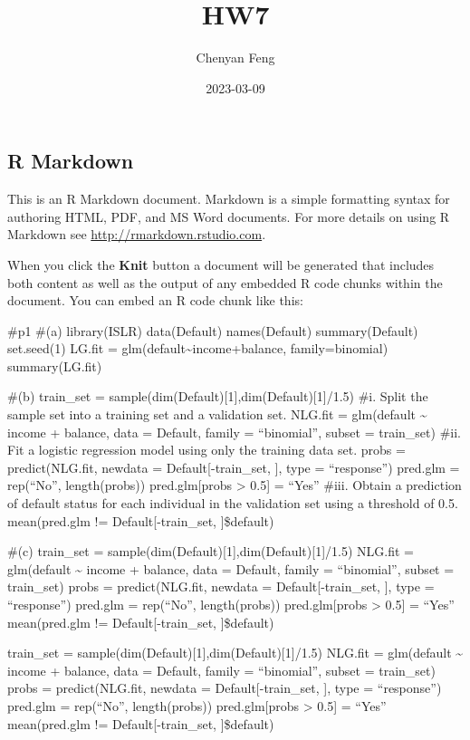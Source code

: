 \documentclass[
]{article}
\title{HW7}
\author{Chenyan Feng}
\date{2023-03-09}
\begin{document}
\maketitle

\hypertarget{r-markdown}{%
\subsection{R Markdown}\label{r-markdown}}

This is an R Markdown document. Markdown is a simple formatting syntax
for authoring HTML, PDF, and MS Word documents. For more details on
using R Markdown see \url{http://rmarkdown.rstudio.com}.

When you click the \textbf{Knit} button a document will be generated
that includes both content as well as the output of any embedded R code
chunks within the document. You can embed an R code chunk like this:

\#p1 \#(a) library(ISLR) data(Default) names(Default) summary(Default)
set.seed(1) LG.fit = glm(default\textasciitilde income+balance,
family=binomial) summary(LG.fit)

\#(b) train\_set = sample(dim(Default){[}1{]},dim(Default){[}1{]}/1.5)
\#i. Split the sample set into a training set and a validation set.
NLG.fit = glm(default \textasciitilde{} income + balance, data =
Default, family = ``binomial'', subset = train\_set) \#ii. Fit a
logistic regression model using only the training data set. probs =
predict(NLG.fit, newdata = Default{[}-train\_set, {]}, type =
``response'') pred.glm = rep(``No'', length(probs)) pred.glm{[}probs
\textgreater{} 0.5{]} = ``Yes'' \#iii. Obtain a prediction of default
status for each individual in the validation set using a threshold of
0.5. mean(pred.glm != Default{[}-train\_set, {]}\$default)

\#(c) train\_set = sample(dim(Default){[}1{]},dim(Default){[}1{]}/1.5)
NLG.fit = glm(default \textasciitilde{} income + balance, data =
Default, family = ``binomial'', subset = train\_set) probs =
predict(NLG.fit, newdata = Default{[}-train\_set, {]}, type =
``response'') pred.glm = rep(``No'', length(probs)) pred.glm{[}probs
\textgreater{} 0.5{]} = ``Yes'' mean(pred.glm != Default{[}-train\_set,
{]}\$default)

train\_set = sample(dim(Default){[}1{]},dim(Default){[}1{]}/1.5) NLG.fit
= glm(default \textasciitilde{} income + balance, data = Default, family
= ``binomial'', subset = train\_set) probs = predict(NLG.fit, newdata =
Default{[}-train\_set, {]}, type = ``response'') pred.glm = rep(``No'',
length(probs)) pred.glm{[}probs \textgreater{} 0.5{]} = ``Yes''
mean(pred.glm != Default{[}-train\_set, {]}\$default)
\end{document}

